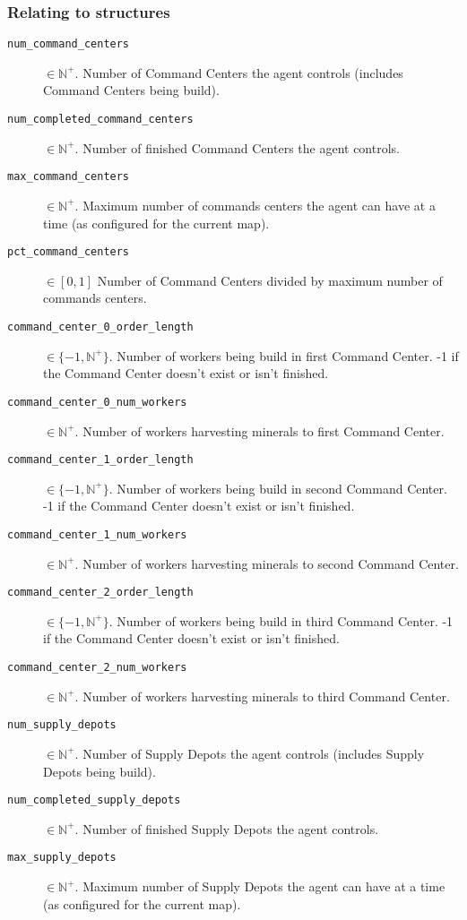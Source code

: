 \subsubsection*{Relating to structures}
\begin{description}
    \item[\texttt{num\_command\_centers}] $\in \mathbb{N}^+$. Number of Command Centers the agent controls (includes Command Centers being build).
    \item[\texttt{num\_completed\_command\_centers}] $\in \mathbb{N}^+$. Number of finished Command Centers the agent controls.
    \item[\texttt{max\_command\_centers}] $\in \mathbb{N}^+$. Maximum number of commands centers the agent can have at a time (as configured for the current map).
    \item[\texttt{pct\_command\_centers}] $\in [0,1]$ Number of Command Centers divided by maximum number of commands centers.
    \item[\texttt{command\_center\_0\_order\_length}] $\in \{-1, \mathbb{N}^+\}$. Number of workers being build in first Command Center. -1 if the Command Center doesn't exist or isn't finished.
    \item[\texttt{command\_center\_0\_num\_workers}] $\in \mathbb{N}^+$. Number of workers harvesting minerals to first Command Center.
    \item[\texttt{command\_center\_1\_order\_length}] $\in \{-1, \mathbb{N}^+\}$. Number of workers being build in second Command Center. -1 if the Command Center doesn't exist or isn't finished.
    \item[\texttt{command\_center\_1\_num\_workers}] $\in \mathbb{N}^+$. Number of workers harvesting minerals to second Command Center.
    \item[\texttt{command\_center\_2\_order\_length}] $\in \{-1, \mathbb{N}^+\}$. Number of workers being build in third Command Center. -1 if the Command Center doesn't exist or isn't finished.
    \item[\texttt{command\_center\_2\_num\_workers}] $\in \mathbb{N}^+$. Number of workers harvesting minerals to third Command Center.
    \item[\texttt{num\_supply\_depots}] $\in \mathbb{N}^+$. Number of Supply Depots the agent controls (includes Supply Depots being build).
    \item[\texttt{num\_completed\_supply\_depots}] $\in \mathbb{N}^+$. Number of finished Supply Depots the agent controls.
    \item[\texttt{max\_supply\_depots}] $\in \mathbb{N}^+$. Maximum number of Supply Depots the agent can have at a time (as configured for the current map).

\end{description}
